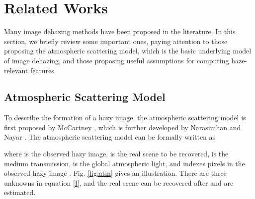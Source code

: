 \documentclass[journal]{IEEEtran}
\begin{document}
\section{Related Works}\label{sec:related}
Many image dehazing methods have been proposed in the literature. In this section, we briefly review some important ones, paying attention to those proposing the atmospheric scattering model, which is the basic underlying model of image dehazing, and  those proposing useful assumptions for computing haze-relevant features.

\subsection{Atmospheric Scattering Model}\label{sec:asm}
To describe the formation of a hazy image, the atmospheric scattering model is first proposed by McCartney \cite{atmosphere}, which is further developed by Narasimhan and Nayar \cite{badweather,narasimhan}. The atmospheric scattering model can be formally written as

where  is the observed hazy image,  is the real scene to be recovered,  is the medium transmission,  is the global atmospheric light, and  indexes pixels in the observed hazy image . Fig. \ref{fig:atm} gives an illustration. There are three unknowns in equation \eqref{I}, and the real scene  can be recovered after  and  are estimated.


\begin{figure*}
    \begin{minipage}{0.5\linewidth}
    \flushleft
    \end{minipage}
    \begin{minipage}{0.5\linewidth}
    \flushright
    \end{minipage}
    \caption{Imaging in hazy weather and atmospheric scattering model}
    \label{fig:atm}
\end{figure*}
\end{document}
